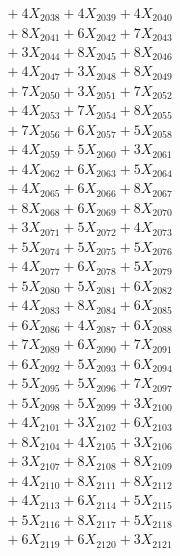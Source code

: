\documentclass[a4paper,10pt]{article}
\begin{document}
{\begin{align}
&\;  + 4 X_{2038} + 4 X_{2039} + 4 X_{2040} \\[0.3ex]
&\;  + 8 X_{2041} + 6 X_{2042} + 7 X_{2043} \\[0.3ex]
&\;  + 3 X_{2044} + 8 X_{2045} + 8 X_{2046} \\[0.3ex]
&\;  + 4 X_{2047} + 3 X_{2048} + 8 X_{2049} \\[0.5ex]\allowbreak
&\;  + 7 X_{2050} + 3 X_{2051} + 7 X_{2052} \\[0.3ex]
&\;  + 4 X_{2053} + 7 X_{2054} + 8 X_{2055} \\[0.3ex]
&\;  + 7 X_{2056} + 6 X_{2057} + 5 X_{2058} \\[0.3ex]
&\;  + 4 X_{2059} + 5 X_{2060} + 3 X_{2061} \\[0.3ex]
&\;  + 4 X_{2062} + 6 X_{2063} + 5 X_{2064} \\[0.3ex]
&\;  + 4 X_{2065} + 6 X_{2066} + 8 X_{2067} \\[0.3ex]
&\;  + 8 X_{2068} + 6 X_{2069} + 8 X_{2070} \\[0.3ex]
&\;  + 3 X_{2071} + 5 X_{2072} + 4 X_{2073} \\[0.3ex]
&\;  + 5 X_{2074} + 5 X_{2075} + 5 X_{2076} \\[0.3ex]
&\;  + 4 X_{2077} + 6 X_{2078} + 5 X_{2079} \\[0.5ex]\allowbreak
&\;  + 5 X_{2080} + 5 X_{2081} + 6 X_{2082} \\[0.3ex]
&\;  + 4 X_{2083} + 8 X_{2084} + 6 X_{2085} \\[0.3ex]
&\;  + 6 X_{2086} + 4 X_{2087} + 6 X_{2088} \\[0.3ex]
&\;  + 7 X_{2089} + 6 X_{2090} + 7 X_{2091} \\[0.3ex]
&\;  + 6 X_{2092} + 5 X_{2093} + 6 X_{2094} \\[0.3ex]
&\;  + 5 X_{2095} + 5 X_{2096} + 7 X_{2097} \\[0.3ex]
&\;  + 5 X_{2098} + 5 X_{2099} + 3 X_{2100} \\[0.3ex]
&\;  + 4 X_{2101} + 3 X_{2102} + 6 X_{2103} \\[0.3ex]
&\;  + 8 X_{2104} + 4 X_{2105} + 3 X_{2106} \\[0.3ex]
&\;  + 3 X_{2107} + 8 X_{2108} + 8 X_{2109} \\[0.5ex]\allowbreak
&\;  + 4 X_{2110} + 8 X_{2111} + 8 X_{2112} \\[0.3ex]
&\;  + 4 X_{2113} + 6 X_{2114} + 5 X_{2115} \\[0.3ex]
&\;  + 5 X_{2116} + 8 X_{2117} + 5 X_{2118} \\[0.3ex]
&\;  + 6 X_{2119} + 6 X_{2120} + 3 X_{2121} \\[0.3ex]

\end{align}}
\end{document}
